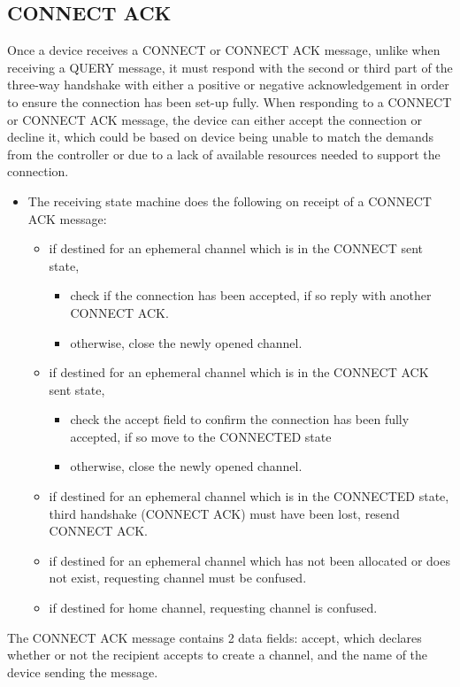 \subsection{CONNECT ACK} %
\label{sub:connect_ack}
Once a device receives a CONNECT or CONNECT ACK message, unlike when receiving a QUERY message, it must respond with the second or third part of the three-way handshake with either a positive or negative acknowledgement in order to ensure the connection has been set-up fully. When responding to a CONNECT or CONNECT ACK message, the device can either accept the connection or decline it, which could be based on device being unable to match the demands from the controller or due to a lack of available resources needed to support the connection.
\vspace{-5mm} 
\begin{itemize}
	\item []The receiving state machine does the following on receipt of a CONNECT ACK message:
	\begin{itemize}
		\item if destined for an ephemeral channel which is in the CONNECT sent state,
		\begin{itemize}
		 	\item check if the connection has been accepted, if so reply with another CONNECT ACK.
		 	\item otherwise, close the newly opened channel.
		\end{itemize} 
		\item if destined for an ephemeral channel which is in the CONNECT ACK sent state,
		\begin{itemize}
		  	\item check the accept field to confirm the connection has been fully accepted, if so move to the CONNECTED state
		  	\item otherwise, close the newly opened channel.
		\end{itemize} 
		\item if destined for an ephemeral channel which is in the CONNECTED state, third handshake (CONNECT ACK) must have been lost, resend CONNECT ACK.
		\item if destined for an ephemeral channel which has not been allocated or does not exist, requesting channel must be confused.
		\item if destined for home channel, requesting channel is confused.
	\end{itemize}
\end{itemize}
The CONNECT ACK message contains 2 data fields: accept, which declares whether or not the recipient accepts to create a channel, and the name of the device sending the message.

